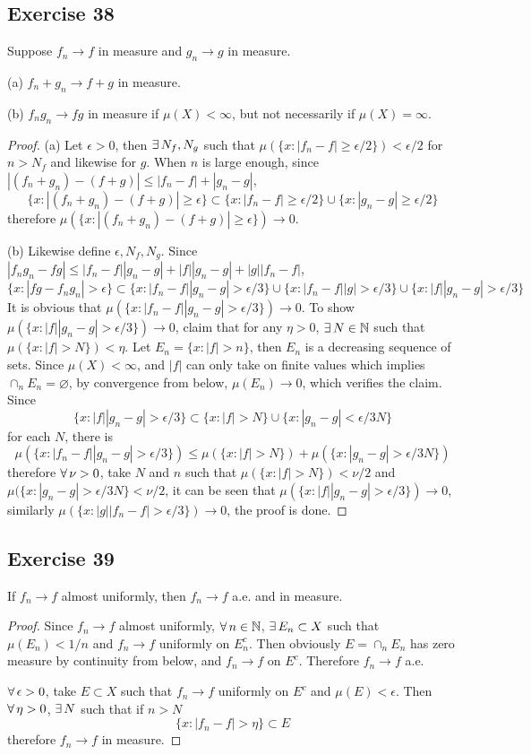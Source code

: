 \subsection*{Exercise 38}
Suppose $f_n\to f$ in measure and $g_n\to g$ in measure.
\par (a) $f_n+g_n\to f+g$ in measure.
\par (b) $f_ng_n\to fg$ in measure if $\mu(X)<\infty$, but not necessarily if $\mu(X)=\infty$.
\begin{proof}
    \par (a) Let $\epsilon>0$, then $\exists\, N_f, N_g$ such that $\mu(\{x:|f_n-f|\ge\epsilon/2\})<\epsilon/2$ for $n>N_f$ and likewise for $g$. When $n$ is large enough, since $|(f_n+g_n)-(f+g)|\le|f_n-f|+|g_n-g|$,
    $$
    \{x:|(f_n+g_n)-(f+g)|\ge\epsilon\}\subset\{x:|f_n-f|\ge\epsilon/2\}\cup\{x:|g_n-g|\ge\epsilon/2\}
    $$
    therefore $\mu(\{x:|(f_n+g_n)-(f+g)|\ge\epsilon\})\to 0$.
    \par (b) Likewise define $\epsilon, N_f, N_g$. Since $|f_ng_n-fg|\le|f_n-f||g_n-g|+|f||g_n-g|+|g||f_n-f|$,
    $$
    \{x:|fg-f_ng_n|>\epsilon\}\subset\{x:|f_n-f||g_n-g|>\epsilon/3\}\cup\{x:|f_n-f||g|>\epsilon/3\}\cup\{x:|f||g_n-g|>\epsilon/3\}
    $$
    It is obvious that $\mu(\{x:|f_n-f||g_n-g|>\epsilon/3\})\to 0$. To show $\mu(\{x:|f||g_n-g|>\epsilon/3\})\to 0$, claim that for any $\eta>0$, $\exists\, N\in\mathbb{N}$ such that $\mu(\{x:|f|>N\})<\eta$. Let $E_n=\{x:|f|>n\}$, then $E_n$ is a decreasing sequence of sets. Since $\mu(X)<\infty$, and $|f|$ can only take on finite values which implies $\cap_nE_n=\varnothing$, by convergence from below, $\mu(E_n)\to 0$, which verifies the claim. Since
    $$
    \{x:|f||g_n-g|>\epsilon/3\}\subset\{x:|f|>N\}\cup\{x:|g_n-g|<\epsilon/3N\}
    $$
    for each $N$, there is
    $$
    \mu(\{x:|f_n-f||g_n-g|>\epsilon/3\})\le\mu(\{x:|f|>N\})+\mu(\{x:|g_n-g|>\epsilon/3N\})
    $$
    therefore $\forall\,\nu>0$, take $N$ and $n$ such that $\mu(\{x:|f|>N\})<\nu/2$ and $\mu(\{x:|g_n-g|>\epsilon/3N\}<\nu/2$, it can be seen that $\mu(\{x:|f||g_n-g|>\epsilon/3\})\to 0$, similarly $\mu(\{x:|g||f_n-f|>\epsilon/3\})\to 0$, the proof is done.
\end{proof}
\subsection*{Exercise 39}
If $f_n\to f$ almost uniformly, then $f_n\to f$ a.e. and in measure.
\begin{proof}
    Since $f_n\to f$ almost uniformly, $\forall\, n\in\mathbb{N}$, $\exists\, E_n\subset X$ such that $\mu(E_n)<1/n$ and $f_n\to f$ uniformly on $E_n^c$. Then obviously $E=\cap_nE_n$ has zero measure by continuity from below, and $f_n\to f$ on $E^c$. Therefore $f_n\to f$ a.e. 
    \par $\forall\,\epsilon>0$, take $E\subset X$ such that $f_n\to f$ uniformly on $E^c$ and $\mu(E)<\epsilon$. Then $\forall\,\eta>0$, $\exists\, N$ such that if $n>N$
    $$
    \{x:|f_n-f|>\eta\}\subset E
    $$
    therefore $f_n\to f$ in measure.
\end{proof}
